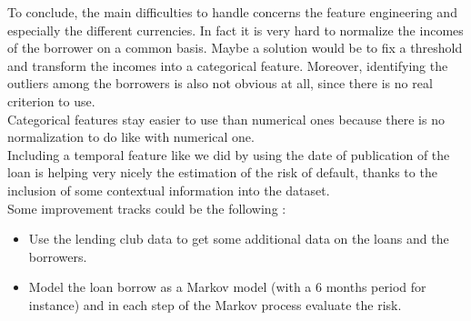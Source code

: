 To conclude, the main difficulties to handle concerns the feature engineering and especially the different currencies. In fact it is very hard to normalize the incomes of the borrower on a common basis. Maybe a solution would be to fix a threshold and transform the incomes into a categorical feature. Moreover, identifying the outliers among the borrowers is also not obvious at all, since there is no real criterion to use.\\

Categorical features stay easier to use than numerical ones because there is no normalization to do like with numerical one.\\

Including a temporal feature like we did by using the date of publication of the loan is helping very nicely the estimation of the risk of default, thanks to the inclusion of some contextual information into the dataset.\\

Some improvement tracks could be the following :
\begin{itemize}
	\item Use the lending club data to get some additional data on the loans and the borrowers.
	\item Model the loan borrow as a Markov model (with a 6 months period for instance) and in each step of the Markov process evaluate the risk.
\end{itemize}
